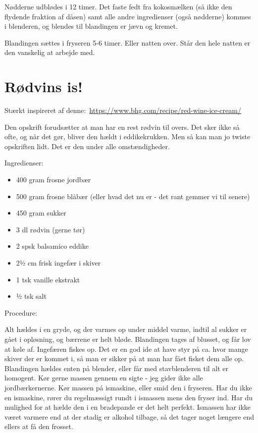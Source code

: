 \documentclass[
]{book}
\providecommand{\tightlist}{%
  \setlength{\itemsep}{0pt}\setlength{\parskip}{0pt}}
\begin{document}
Nødderne udblødes i 12 timer. Det faste fedt fra kokosmælken (så ikke den flydende fraktion af dåsen) samt alle andre ingredienser (også nødderne) kommes i blenderen, og blendes til blandingen er jævn og kremet.

Blandingen sættes i fryseren 5-6 timer. Eller natten over. Står den hele natten er den vanskelig at arbejde med.

\section{Rødvins is!}\label{ruxf8dvins-is}

Stærkt inspireret af denne:~\url{https://www.bhg.com/recipe/red-wine-ice-cream/}

Den opskrift forudsætter at man har en rest rødvin til overs. Det sker ikke så ofte, og når det gør, bliver den hældt i eddikekrukken. Men så kan man jo twiste opskriften lidt. Det er den under alle omstændigheder.

Ingredienser:

\begin{itemize}
\tightlist
\item
  400 gram frosne jordbær
\item
  500 gram frosne blåbær (eller hvad det nu er - det rant gemmer vi til senere)
\item
  450 gram sukker
\item
  3 dl rødvin (gerne tør)
\item
  2 spsk balsamico eddike
\item
  2½ cm frisk ingefær i skiver
\item
  1 tsk vanille ekstrakt
\item
  ½ tsk salt
\end{itemize}

Procedure:

Alt hældes i en gryde, og der varmes op under middel varme, indtil al sukker er gået i opløsning, og bærrene er helt bløde.
Blandingen tages af blusset, og får lov at køle af. Ingefæren fiskes op. Det er en god ide at have styr på ca. hvor mange skiver der er kommet i, så man er sikker på at man har fået fisket dem alle op.
Blandingen hældes enten på blender, eller får med stavblenderen til alt er homogent. Kør gerne massen gennem en sigte - jeg gider ikke alle jordbærkernerne.
Kør massen på ismaskine, eller smid den i fryseren. Har du ikke en ismaskine, rører du regelmæssigt rundt i ismassen mens den fryser ind. Har du mulighed for at hælde den i en bradepande er det helt perfekt. Ismassen har ikke været varmere end at der stadig er alkohol tilbage, så det tager noget længere end ellers at få den frosset.
\end{document}
